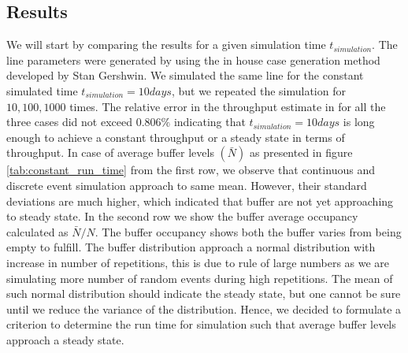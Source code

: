 \subsection{Results} 
We will start by comparing the results for a given simulation time $t_{simulation}$. The line parameters were generated by using the in house case generation method developed by Stan Gershwin. We simulated the same line for the constant simulated time $t_{simulation} = 10 days$, but we repeated the simulation for $10, 100, 1000$ times. The relative error in the throughput estimate in for all the three cases did not exceed $0.806\%$  indicating that $t_{simulation} = 10 days$ is long enough to achieve a constant throughput or a steady state in terms of throughput. In case of average buffer levels $(\bar{N})$ as presented in figure \ref{tab:constant_run_time} from the first row, we observe that continuous and discrete event simulation approach to same mean. However, their standard deviations are much higher, which indicated that buffer are not yet approaching to steady state. In the second row we show the buffer average occupancy calculated as $\bar{N} / N$. The buffer occupancy shows both the buffer varies from being empty to fulfill. The buffer distribution approach a normal distribution with increase in number of repetitions, this is due to rule of large numbers as we are simulating more number of random events during high repetitions. The mean of such normal distribution should indicate the steady state, but one cannot be sure until we reduce the variance of the distribution.  Hence, we decided to formulate a criterion to determine the run time for simulation such that average buffer levels approach a steady state. \par
